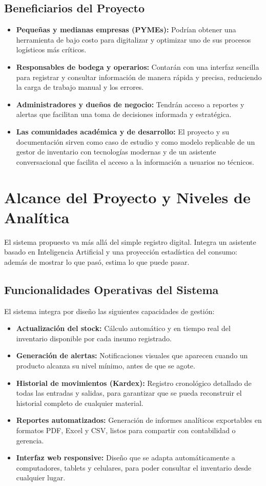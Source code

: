 \subsection{Beneficiarios del Proyecto}
\label{sec:beneficiarios}

\begin{itemize}
    \item \textbf{Pequeñas y medianas empresas (PYMEs):} Podrían obtener una herramienta de bajo costo para digitalizar y optimizar uno de sus procesos logísticos más críticos.
    \item \textbf{Responsables de bodega y operarios:} Contarán con una interfaz sencilla para registrar y consultar información de manera rápida y precisa, reduciendo la carga de trabajo manual y los errores.
    \item \textbf{Administradores y dueños de negocio:} Tendrán acceso a reportes y alertas que facilitan una toma de decisiones informada y estratégica.
    \item \textbf{Las comunidades académica y de desarrollo:} El proyecto y su documentación sirven como caso de estudio y como modelo replicable de un gestor de inventario con tecnologías modernas y de un asistente conversacional que facilita el acceso a la información a usuarios no técnicos.
\end{itemize}


\section{Alcance del Proyecto y Niveles de Analítica}

El sistema propuesto va más allá del simple registro digital. Integra un asistente basado en Inteligencia Artificial y una proyección estadística del consumo: además de mostrar lo que pasó, estima lo que puede pasar.

\subsection{Funcionalidades Operativas del Sistema}
El sistema integra por diseño las siguientes capacidades de gestión:
\begin{itemize}
    \item \textbf{Actualización del stock:} Cálculo automático y en tiempo real del inventario disponible por cada insumo registrado.
    \item \textbf{Generación de alertas:} Notificaciones visuales que aparecen cuando un producto alcanza su nivel mínimo, antes de que se agote.
    \item \textbf{Historial de movimientos (Kardex):} Registro cronológico detallado de todas las entradas y salidas, para garantizar que se pueda reconstruir el historial completo de cualquier material.
    \item \textbf{Reportes automatizados:} Generación de informes analíticos exportables en formatos PDF, Excel y CSV, listos para compartir con contabilidad o gerencia.
    \item \textbf{Interfaz web responsive:} Diseño que se adapta automáticamente a computadores, tablets y celulares, para poder consultar el inventario desde cualquier lugar.
\end{itemize}

